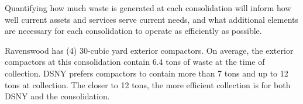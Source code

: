
    Quantifying how much waste is generated at each consolidation will inform how well current assets and services serve current needs, and what additional elements are necessary for each consolidation to operate as efficiently as possible.
    
    Ravenswood has (4) 30-cubic yard exterior compactors. On average, the exterior compactors at this consolidation contain 6.4 tons of waste at the time of collection. DSNY prefers compactors to contain more than 7 tons and up to 12 tons at collection. The closer to 12 tons, the more efficient collection is for both DSNY and the consolidation.